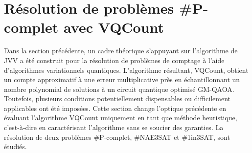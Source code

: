 \chapter{Résolution de problèmes \textsf{\#P}-complet avec VQCount}
\label{cha:resolution-de-problemes-avec-vqcount}

Dans la section précédente, un cadre théorique s'appuyant sur l'algorithme de JVV a été construit pour la résolution de problèmes de comptage à l'aide d'algorithmes variationnels quantiques. L'algorithme résultant, VQCount, obtient un compte approximatif à une erreur multiplicative près en échantillonnant un nombre polynomial de solutions à un circuit quantique optimisé GM-QAOA. Toutefois, plusieurs conditions potentiellement dispensables ou difficilement applicables ont été imposées. Cette section change l'optique précédente en évaluant l'algorithme VQCount uniquement en tant que méthode heuristique, c'est-à-dire en caractérisant l'algorithme sans se soucier des garanties. La résolution de deux problèmes \textsf{\#P}-complet, \#NAE3SAT et \#1in3SAT, sont étudiés.

